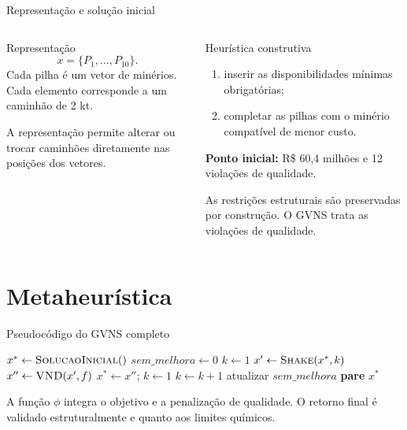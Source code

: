\documentclass[aspectratio=169]{beamer}
\begin{document}
\begin{frame}{Representação e solução inicial}
\begin{columns}[T]
    \begin{column}{0.47\textwidth}
        \begin{block}{Representação}
            \[
                x = \{P_1,\ldots,P_{10}\}.
            \]
            Cada pilha é um vetor de minérios. Cada elemento corresponde a um
            caminhão de 2 kt.
        \end{block}

        A representação permite alterar ou trocar caminhões diretamente nas
        posições dos vetores.
    \end{column}

    \begin{column}{0.49\textwidth}
        \begin{exampleblock}{Heurística construtiva}
            \begin{enumerate}
                \item inserir as disponibilidades mínimas obrigatórias;
                \item completar as pilhas com o minério compatível de menor custo.
            \end{enumerate}
        \end{exampleblock}

        \textbf{Ponto inicial:} R\$ 60,4 milhões e 12 violações de qualidade.

        \vspace{0.3cm}
        As restrições estruturais são preservadas por construção. O GVNS trata
        as violações de qualidade.
    \end{column}
\end{columns}
\end{frame}

\section{Metaheurística}
\begin{frame}{Pseudocódigo do GVNS completo}
\scriptsize
\begin{algorithmic}[1]
    \State $x^* \gets \textsc{SolucaoInicial}()$
    \State $sem\_melhora \gets 0$
        \State $k \gets 1$
            \State $x' \gets \textsc{Shake}(x^*, k)$
            \State $x'' \gets \textsc{VND}(x', f)$
                \State $x^* \gets x''$; $k \gets 1$
            \Else
                \State $k \gets k + 1$
            \EndIf
        \EndWhile
        \State atualizar $sem\_melhora$
            \State \textbf{pare}
        \EndIf
    \EndFor
    \State \Return $x^*$
\end{algorithmic}

\footnotesize
A função $\phi$ integra o objetivo e a penalização de qualidade. O retorno final
é validado estruturalmente e quanto aos limites químicos.
\end{frame}
\end{document}
